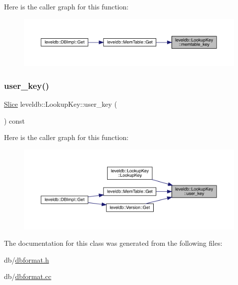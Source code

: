 Here is the caller graph for this function\+:
\nopagebreak
\begin{figure}[H]
\begin{center}
\leavevmode
\includegraphics[width=350pt]{classleveldb_1_1_lookup_key_aa53ebf124713e32632a7aaaee359ac22_icgraph}
\end{center}
\end{figure}
\mbox{\label{classleveldb_1_1_lookup_key_a35812939729922656f6dc98c43216265}} 
\subsubsection{\texorpdfstring{user\_key()}{user\_key()}}
{\footnotesize\ttfamily \mbox{\hyperlink{classleveldb_1_1_slice}{Slice}} leveldb\+::\+Lookup\+Key\+::user\+\_\+key (\begin{DoxyParamCaption}{ }\end{DoxyParamCaption}) const\hspace{0.3cm}{\ttfamily [inline]}}

Here is the caller graph for this function\+:
\nopagebreak
\begin{figure}[H]
\begin{center}
\leavevmode
\includegraphics[width=350pt]{classleveldb_1_1_lookup_key_a35812939729922656f6dc98c43216265_icgraph}
\end{center}
\end{figure}


The documentation for this class was generated from the following files\+:\begin{DoxyCompactItemize}
\item 
db/\mbox{\hyperlink{dbformat_8h}{dbformat.\+h}}\item 
db/\mbox{\hyperlink{dbformat_8cc}{dbformat.\+cc}}\end{DoxyCompactItemize}
